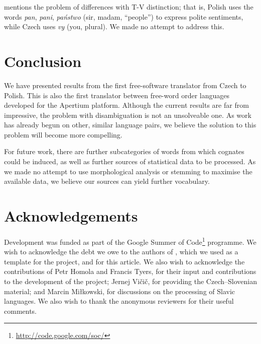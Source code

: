 \documentclass[11pt]{article}
\begin{document}
\cite{Debowski02} mentions the problem of differences with T-V distinction; that is,
Polish uses the words \emph{pan}, \emph{pani}, \emph{państwo} (sir, madam, ``people'')
to express polite sentiments, while Czech uses \emph{vy} (you, plural). We made no
attempt to address this.

\section{Conclusion}

We have presented results from the first free-software translator from Czech to 
Polish. This is also the first translator between free-word order languages
developed for the Apertium platform. Although the current results are far from
impressive, the problem with disambiguation is not an unsolveable one. As
work has already begun on other, similar language pairs, we
believe the solution to this problem will become more compelling.

For future work, there are further subcategories of words from which cognates
could be induced, as well as further sources of statistical data to be
processed. As we made no attempt to use morphological analysis or stemming
to maximise the available data, we believe our sources can yield
further vocabulary.

\section{Acknowledgements}

Development was funded as part of the Google Summer of Code\footnote{\url{http://code.google.com/soc/}} 
programme. 
We wish to acknowledge the debt we owe to the authors of \cite{tyers2009rfr}, which 
we used as a template for the project, and for this article.
We also wish to acknowledge the contributions of Petr Homola and Francis Tyers, for their
input and contributions to the development of the project; Jernej Vičič, for providing the
Czech--Slovenian material; and Marcin Miłkowski, for discussions on the processing of Slavic 
languages. We also wish to thank the anonymous reviewers for their useful comments.



\end{document}
